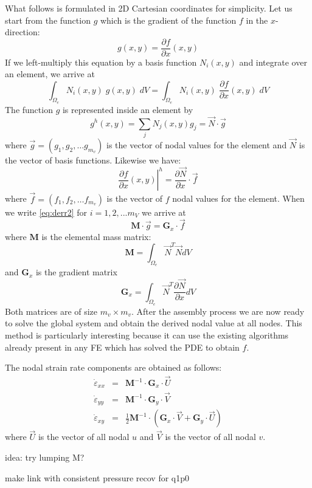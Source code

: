 What follows is formulated in 2D Cartesian coordinates for simplicity. 
Let us start from the function $g$ which is the gradient of the function $f$
in the $x$-direction:
\[
g(x,y) = \frac{\partial f}{\partial x}(x,y)
\]
If we left-multiply this equation by a basis function $N_i(x,y)$ 
and integrate over an element, we arrive at 
\begin{equation}
\int_{\Omega_e} N_i(x,y)\; g(x,y)\; dV =
\int_{\Omega_e} N_i(x,y)\; \frac{\partial f}{\partial x}(x,y)\; dV
\label{eq:derr2}
\end{equation}
The function $g$ is represented inside an element by
\[
g^h(x,y) = \sum_j N_j(x,y) g_j = \vec{N} \cdot \vec{g}
\]
where $\vec{g}=(g_1,g_2,\dots g_{m_v})$ is the vector of nodal values for the element
and $\vec{N}$ is the vector of basis functions.
Likewise we have:
\[
\left. \frac{\partial f}{\partial x}(x,y) \right|^h = \frac{\partial \vec{N}}{\partial x}\cdot \vec{f}
\]
where $\vec{f}=(f_1,f_2,\dots f_{m_v})$ is the vector of $f$ nodal values for the element.
When we write \eqref{eq:derr2} for $i=1,2,...m_V$ we arrive at
\[
{\bm M}\cdot \vec{g} = {\bm G}_x\cdot \vec{f}
\]
where ${\bm M}$ is the elemental mass matrix:
\[
{\bm M}=\int_{\Omega_e} \vec{N}^T \vec{N} dV
\]
and ${\bm G}_x$ is the gradient matrix 
\[
{\bm G}_x=\int_{\Omega_e} \vec{N}^T \frac{\partial \vec{N}}{\partial x} dV
\]
Both matrices are of size $m_v \times m_v$.
After the assembly process we are now ready to solve the global system and obtain
the derived nodal value at all nodes. 
This method is particularly interesting because it can use the existing algorithms 
already present in any FE which has solved the PDE to obtain $f$.  

The nodal strain rate components are obtained as follows:
\begin{eqnarray}
\dot{\varepsilon}_{xx} &=& {\bm M}^{-1} \cdot {\bm G}_x \cdot \vec{U} \\
\dot{\varepsilon}_{yy} &=& {\bm M}^{-1} \cdot {\bm G}_y \cdot \vec{V} \\
\dot{\varepsilon}_{xy} &=& \frac{1}{2} {\bm M}^{-1} \cdot \left( {\bm G}_x \cdot \vec{V} + {\bm G}_y \cdot \vec{U} \right)
\end{eqnarray}
where $\vec{U}$ is the vector of all nodal $u$ and $\vec{V}$ is the vector of all nodal $v$.


idea: try lumping M?

make link with consistent pressure recov for q1p0









